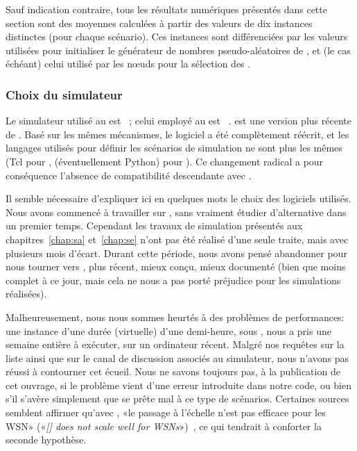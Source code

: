 Sauf indication contraire, tous les résultats numériques présentés dans cette section sont des moyennes calculées à partir des valeurs de dix instances distinctes (pour chaque scénario).
Ces instances sont différenciées par les valeurs utilisées pour initialiser le générateur de nombres pseudo-aléatoires de \nsii, et (le cas échéant) celui utilisé par les nœuds pour la sélection des \cns.

        \subsubsection{Choix du simulateur}

Le simulateur utilisé au  est \nsii~\cite{ns2}; celui employé au  est \nsiii~\cite{ns3}.
\nsiii est une version plus récente de \nsii.
Basé sur les mêmes mécanismes, le logiciel a été complètement réécrit, et les langages utilisés pour définir les scénarios de simulation ne sont plus les mêmes (Tcl pour \nsii, \cpp (éventuellement Python) pour \nsiii).
Ce changement radical a pour conséquence l'absence de compatibilité descendante avec \nsii.

Il semble nécessaire d'expliquer ici en quelques mots le choix des logiciels utilisés.
Nous avons commencé à travailler sur \nsii, sans vraiment étudier d'alternative dans un premier temps.
Cependant les travaux de simulation présentés aux chapitres~\ref{chap:sa} et~\ref{chap:se} n'ont pas été réalisé d'une seule traite, mais avec plusieurs mois d'écart.
Durant cette période, nous avons pensé abandonner \nsii pour nous tourner vers \nsiii, plus récent, mieux conçu, mieux documenté (bien que moins complet à ce jour, mais cela ne nous a pas porté préjudice pour les simulations réalisées).

Malheureusement, nous nous sommes heurtés à des problèmes de performances: une instance d'une durée (virtuelle) d'une demi-heure, sous \nsiii, nous a pris une semaine entière à exécuter, sur un ordinateur récent.
Malgré nos requêtes sur la liste ainsi que sur le canal de discussion associés au simulateur, nous n'avons pas réussi à contourner cet écueil.
Nous ne savons toujours pas, à la publication de cet ouvrage, si le problème vient d'une erreur introduite dans notre code, ou bien s'il s'avère simplement que \nsiii se prête mal à ce type de scénarios.
Certaines sources semblent affirmer qu'avec \nsiii, «le passage à l'échelle n'est pas efficace pour les WSN» («\textit{[\nsiiinxs] does not scale well for WSNs}»)~\cite{AAAHN12}, ce qui tendrait à conforter la seconde hypothèse.

